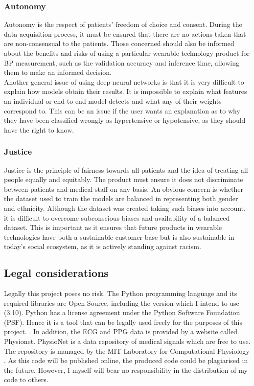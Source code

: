 \documentclass[11pt, a4paper]{article}
\begin{document}
\subsubsection{Autonomy}
Autonomy is the respect of patients' freedom of choice and consent. During the data acquisition process, it must be ensured that there are no actions taken that are non-consensual to the patients. Those concerned should also be informed about the benefits and risks of using a particular wearable technology product for BP measurement, such as the validation accuracy and inference time, allowing them to make an informed decision. \\ \newline \noindent Another general issue of using deep neural networks is that it is very difficult to explain how models obtain their results. It is impossible to explain what features an individual or end-to-end model detects and what any of their weights correspond to. This can be an issue if the user wants an explanation as to why they have been classified wrongly as hypertensive or hypotensive, as they should have the right to know.

\subsubsection{Justice}
Justice is the principle of fairness towards all patients and the idea of treating all people equally and equitably. The product must ensure it does not discriminate between patients and medical staff on any basis. An obvious concern is whether the dataset used to train the models are balanced in representing both gender and ethnicity. Although the dataset was created taking such biases into account, it is difficult to overcome subconscious biases and availability of a balanced dataset. This is important as it ensures that future products in wearable technologies have both a sustainable customer base but is also sustainable in today's social ecosystem, as it is actively standing against racism.

\subsection{Legal considerations}
Legally this project poses no risk. The Python programming language and its required libraries are Open Source, including the version which I intend to use (3.10). Python has a license agreement under the Python Software Foundation (PSF). Hence it is a tool that can be legally used freely for the purposes of this project. \cite{Python}. In addition, the ECG and PPG data is provided by a website called Physionet. PhysioNet is a data repository of medical signals which are free to use. The repository is managed by the MIT Laboratory for Computational Physiology \cite{Goldberger2000} \cite{Physionet}. As this code will be published online, the produced code could be plagiarised in the future. However, I myself will bear no responsibility in the distribution of my code to others.
\end{document}
